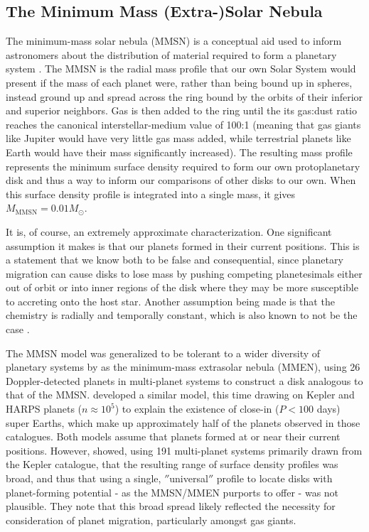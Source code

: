 

\subsection{The Minimum Mass (Extra-)Solar Nebula}

The minimum-mass solar nebula (MMSN) is a conceptual aid used to inform astronomers about the distribution of material required to form a planetary system \citep{Weidenschilling1977}. The MMSN is the radial mass profile that our own Solar System would present if the mass of each planet were, rather than being bound up in spheres, instead ground up and spread across the ring bound by the orbits of their inferior and superior neighbors. Gas is then added to the ring until the its gas:dust ratio reaches the canonical interstellar-medium value of 100:1 (meaning that gas giants like Jupiter would have very little gas mass added, while terrestrial planets like Earth would have their mass significantly increased). The resulting mass profile represents the minimum surface density required to form our own protoplanetary disk and thus a way to inform our comparisons of other disks to our own. When this surface density profile is integrated into a single mass, it gives $M_\text{MMSN} = 0.01 M_{\odot}$.

It is, of course, an extremely approximate characterization. One significant assumption it makes is that our planets formed in their current positions. This is a statement that we know both to be false \citep{Walsh2011,Tsiganis2005} and consequential, since planetary migration can cause disks to lose mass by pushing competing planetesimals either out of orbit or into inner regions of the disk where they may be more susceptible to accreting onto the host star. Another assumption being made is that the chemistry is radially and temporally constant, which is also known to not be the case \citep{vanDishoeckBlake1998}.

The MMSN model was generalized to be tolerant to a wider diversity of planetary systems by \citet{Kuchner2004} as the minimum-mass extrasolar nebula (MMEN), using 26 Doppler-detected planets in multi-planet systems to construct a disk analogous to that of the MMSN. \citet{ChiangLaughlin2013} developed a similar model, this time drawing on Kepler and HARPS planets ($n \approx 10^5$) to explain the existence of close-in ($P < 100$ days) super Earths, which make up approximately half of the planets observed in those catalogues. Both models assume that planets formed at or near their current positions. However, \citet{Raymond2014} showed, using 191 multi-planet systems primarily drawn from the Kepler catalogue, that the resulting range of surface density profiles was broad, and thus that using a single, $''$universal$''$ profile to locate disks with planet-forming potential - as the MMSN/MMEN purports to offer - was not plausible. They note that this broad spread likely reflected the necessity for consideration of planet migration, particularly amongst gas giants.


